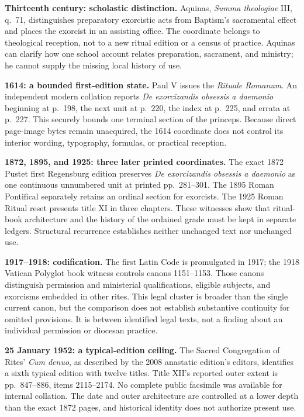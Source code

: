 \medskip\noindent\textbf{Thirteenth century: scholastic distinction.}
Aquinas, \emph{Summa theologiae} III, q.~71, distinguishes preparatory
exorcistic acts from Baptism's sacramental effect and places the exorcist in
an assisting office. The coordinate belongs to theological reception, not to
a new ritual edition or a census of practice. Aquinas can clarify how one
school account relates preparation, sacrament, and ministry; he cannot supply
the missing local history of use.

\medskip\noindent\textbf{1614: a bounded first-edition state.}
Paul V issues the \emph{Rituale Romanum}. An independent modern collation
reports \emph{De exorcizandis obsessis a daemonio} beginning at p.~198, the
next unit at p.~220, the index at p.~225, and errata at p.~227. This securely
bounds one terminal section of the princeps. Because direct page-image bytes
remain unacquired, the 1614 coordinate does not control its interior wording,
typography, formulas, or practical reception.

\medskip\noindent\textbf{1872, 1895, and 1925: three later printed
coordinates.}
The exact 1872 Pustet first Regensburg edition preserves
\emph{De exorcizandis obsessis a daemonio} as one continuous unnumbered unit
at printed pp.~281--301. The 1895 Roman Pontifical separately retains an
ordinal section for exorcists. The 1925 Roman Ritual reset presents title XI
in three chapters. These witnesses show that ritual-book architecture and
the history of the ordained grade must be kept in separate ledgers. Structural
recurrence establishes neither unchanged text nor unchanged use.

\medskip\noindent\textbf{1917--1918: codification.}
The first Latin Code is promulgated in 1917; the 1918 Vatican Polyglot book
witness controls canons 1151--1153. Those canons distinguish permission and
ministerial qualifications, eligible subjects, and exorcisms embedded in
other rites. This legal cluster is broader than the single current canon, but
the comparison does not establish substantive continuity for omitted
provisions. It is between identified legal texts, not a finding about an
individual permission or diocesan practice.

\medskip\noindent\textbf{25 January 1952: a typical-edition ceiling.}
The Sacred Congregation of Rites' \emph{Cum denuo}, as described by the 2008
anastatic edition's editors, identifies a sixth typical edition with twelve
titles. Title XII's reported outer extent is pp.~847--886, items
2115--2174. No complete public facsimile was available for internal
collation. The date and outer architecture are controlled at a lower depth
than the exact 1872 pages, and historical identity does not authorize present
use.

